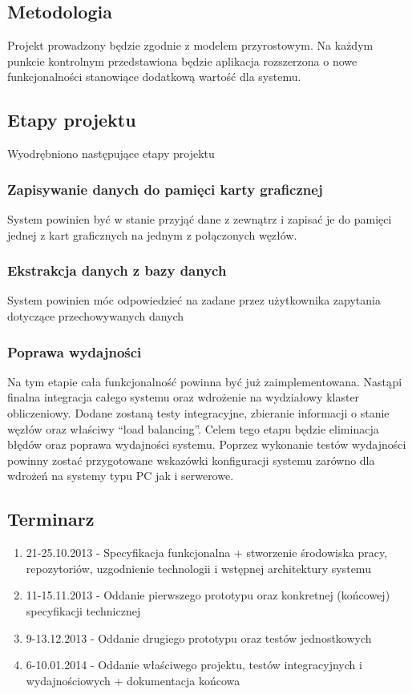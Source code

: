 \documentclass[paper=a4, fontsize=11pt]{scrartcl} %
\numberwithin{equation}{section} %
\numberwithin{figure}{section} %
\numberwithin{table}{section} %
\begin{document}
    \subsection{Metodologia}
    Projekt prowadzony będzie zgodnie z modelem przyrostowym. Na każdym punkcie kontrolnym przedstawiona będzie
    aplikacja rozszerzona o nowe funkcjonalności stanowiące dodatkową wartość dla systemu.

    \subsection{Etapy projektu}
    Wyodrębniono następujące etapy projektu
        \subsubsection{Zapisywanie danych do pamięci karty graficznej}
            System powinien być w stanie przyjąć dane z zewnątrz i zapisać je do pamięci jednej z kart graficznych na jednym z połączonych węzłów.
        \subsubsection{Ekstrakcja danych z bazy danych}
            System powinien móc odpowiedzieć na zadane przez użytkownika zapytania dotyczące przechowywanych danych
        \subsubsection{Poprawa wydajności}
            Na tym etapie cała funkcjonalność powinna być już zaimplementowana. Nastąpi finalna integracja całego systemu
            oraz wdrożenie na wydziałowy klaster obliczeniowy. Dodane zostaną testy integracyjne, zbieranie informacji o stanie węzłów oraz właściwy ``load balancing''. Celem tego etapu będzie eliminacja błędów oraz poprawa wydajności systemu. Poprzez wykonanie testów wydajności powinny zostać przygotowane wskazówki konfiguracji systemu zarówno dla wdrożeń na systemy typu PC jak i serwerowe.
    \subsection{Terminarz}
        \begin{enumerate}
            \item 21-25.10.2013 - Specyfikacja funkcjonalna + stworzenie środowiska pracy, repozytoriów, uzgodnienie technologii i wstępnej architektury systemu
            \item 11-15.11.2013 - Oddanie pierwszego prototypu oraz konkretnej (końcowej) specyfikacji technicznej
            \item 9-13.12.2013 - Oddanie drugiego prototypu oraz testów jednostkowych
            \item 6-10.01.2014 - Oddanie właściwego projektu, testów integracyjnych i wydajnościowych + dokumentacja końcowa
        \end{enumerate}
\end{document}
